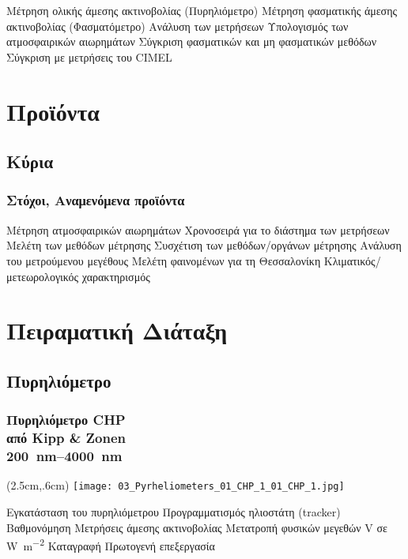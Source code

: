 \documentclass[noamsthm,12pt]{beamer}
\begin{document}
\begin{frame}
	
	\begin{outline}
		\1 Μέτρηση ολικής άμεσης ακτινοβολίας
			\2[] (Πυρηλιόμετρο)
		\1 Μέτρηση φασματικής άμεσης ακτινοβολίας
			\2[] (Φασματόμετρο)
		\1 Ανάλυση των μετρήσεων
			\2[] Υπολογισμός των ατμοσφαιρικών αιωρημάτων
		\1 Σύγκριση φασματικών και μη φασματικών μεθόδων
		\1 Σύγκριση με μετρήσεις του CIMEL
		\end{outline}

\end{frame}

\section{Προϊόντα}

\subsection{Κύρια}

\begin{frame}
	\frametitle{Στόχοι, Αναμενόμενα προϊόντα}
		
	\begin{outline}
		\1 Μέτρηση ατμοσφαιρικών αιωρημάτων
			\2 Χρονοσειρά για το διάστημα των μετρήσεων
		\1 Μελέτη των μεθόδων μέτρησης
		\1 Συσχέτιση των μεθόδων/οργάνων μέτρησης
		\1 Ανάλυση του μετρούμενου μεγέθους
			\2 Μελέτη φαινομένων για τη Θεσσαλονίκη
			\2 Κλιματικός/μετεωρολογικός χαρακτηρισμός
		
	\end{outline}

		
\end{frame}

\section{Πειραματική Διάταξη}

\subsection[Πυρηλιόμετρο]{Πυρηλιόμετρο}

\begin{frame}
	\frametitle{Πυρηλιόμετρο CHP \\{\small από Kipp \& Zonen}\\{\small \SIrange{200}{4000}{\nano\meter}}}

	\begin{textblock*}{3cm}(2.5cm,.6cm) %
	\texttt{[image: 03\_Pyrheliometers\_01\_CHP\_1\_01\_CHP\_1.jpg]}
	\end{textblock*}

	
    \centering
	
	\begin{outline}
		\1 Εγκατάσταση του πυρηλιόμετρου
			\2[] Προγραμματισμός ηλιοστάτη (tracker)
		\1 Βαθμονόμηση 
		\1 Μετρήσεις άμεσης ακτινοβολίας
			\2[] Μετατροπή φυσικών μεγεθών \si{\volt} σε \si{\watt \per \meter^2}
			\2[] Καταγραφή
			\2[] Πρωτογενή επεξεργασία
	\end{outline}


\end{frame}
\end{document}
